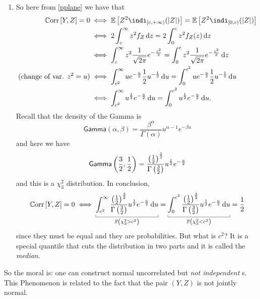 \begin{enumerate}
\begin{align*}
		&=\ubracketthin{\evs_{Z}[Z^{2}]}_{=1}-2\evs_{Z}\left[Z^{2}\indi_{[0,c)}(|Z|)\right]\\
		&=1-2\evs_{Z}\left[Z^{2}\indi_{[0,c)}(|Z|)\right]\\
	\end{align*}
	where
	\begin{align*}
		2\evs_{Z}\left[Z^{2}\indi_{[0,c)}(|Z|)\right]&=\int_{-c}^{+c}z^{2}f_{Z}(z)\dz\\
		&=2\int_{0}^{c}z^{2}f_{Z}(z)\dz.
	\end{align*}
	Therefore 
	\begin{equation*}
		\corr[Y,Z]=1-4\int_{0}^{4}z^{2}f_{Z}(z)\dz.
	\end{equation*}
	\item So here from \ref{pplane} we have that 
	\begin{align*}
		\corr[Y,Z]=0&\iff\ev{Z^{2}\indi_{[c,+\infty)}(|Z|)}=\ev{Z^{2}\indi_{[0,c)}(|Z|)}\\
		&\iff 2\int_{c}^{\infty}z^{2}f_{Z}\dz=2\int_{0}^{c}z^{2}f_{Z}(z)\dz\\
		&\iff\int_{c}^{\infty}z^{2}\frac{1}{\sqrt{2\pi}}e^{-\frac{z^{2}}{2}}=\int_{0}^{c}z^{2}\frac{1}{\sqrt{2\pi}}e^{-\frac{z^{2}}{2}}\dz\\
		\text{(change of var. $z^{2}=u$)}&\iff\int_{c^{2}}^{\infty}ue^{-\frac{u}{2}}\unmezz u^{-\unmezz}\du=\int_{0}^{c^{2}}ue^{-\frac{u}{2}}\unmezz u^{-\unmezz}\du\\
		&\iff\int_{c^{2}}^{\infty}u^{\unmezz}e^{-\frac{u}{2}}\du=\int_{0}^{c^{2}}u^{\unmezz}e^{-\frac{u}{2}}\du.
	\end{align*}
	Recall that the density of the Gamma is
	\begin{equation*}
		\mathsf{Gamma}(\alpha,\beta)=\frac{\beta^{\alpha}}{\Gamma(\alpha)}u^{\alpha-1}e^{-\beta u}
	\end{equation*}
	and here we have
	\begin{equation*}
		\mathsf{Gamma}\left(\frac{3}{2},\frac{1}{2}\right)=\frac{\left(\frac{1}{2}\right)^{\frac{3}{2}}}{\Gamma\left(\frac{3}{2}\right)}u^{\frac{1}{2}}e^{-\frac{u}{2}}
	\end{equation*}
	and this is a $\chi^{2}_{3}$ distribution. In conclusion,
	\begin{equation*}
		\corr[Y,Z]=0\iff\ubracketthin{\int_{c^{2}}^{\infty}\frac{\left(\unmezz\right)^{\frac{3}{2}}}{\Gamma\left(\frac{3}{2}\right)}u^{\unmezz}e^{-\frac{u}{2}}\du}_{\pr\left(\chi^{2}_{3}>c^{2}\right)}=\ubracketthin{\int_{0}^{c^{2}}\frac{\left(\unmezz\right)^{\frac{3}{2}}}{\Gamma\left(\frac{3}{2}\right)}u^{\unmezz}e^{-\frac{u}{2}}\du}_{\pr\left(\chi^{2}_{3}<c^{2}\right)}=\unmezz
	\end{equation*}
	since they must be equal and they are probabilities. But what is $c^{2}$? It is a special quantile that cuts the distribution in two parts and it is called the \emph{median}.
\end{enumerate}
So the moral is: one can construct normal uncorrelated but \textit{not independent} \rv s. This Phenomenon is related to the fact that the pair $(Y,Z)$ is not jointly normal.
